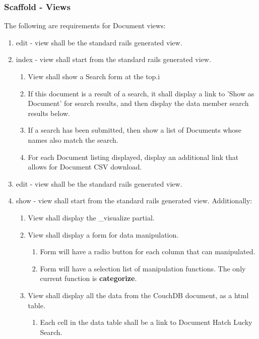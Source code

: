 \subsubsection{Scaffold - Views}
The following are requirements for Document views:
\begin{enumerate}
	\item edit - view shall be the standard rails generated view. 

	\item index - view shall start from the standard rails generated view. 
	\begin{enumerate}
		\item View shall show a Search form at the top.i
		\item If this document is a result of a search, it shall display
			a link to 'Show as Document' for search results, and then
			display the data member search results below.
		\item If a search has been submitted, then show a list of Documents
			whose names also match the search.
		\item For each Document listing displayed, display an additional link
			that allows for Document CSV download.
	\end{enumerate}

	\item edit - view shall be the standard rails generated view. 

	\item show - view shall start from the standard rails generated view. 
	Additionally:
	\begin{enumerate}
		\item View shall display the \_visualize partial.
		\item View shall display a form for data manipulation.
		\begin{enumerate}
			\item Form will have a radio button for each column that can
				manipulated.
			\item Form will have a selection list of manipulation functions.
				The only current function is \textbf{categorize}.
		\end{enumerate}
		\item View shall display all the data from the CouchDB document, as a
			html table.
		\begin{enumerate}
			\item Each cell in the data table shall be a link to Document
				Hatch Lucky Search.
		\end{enumerate}
	\end{enumerate}

\end{enumerate}


